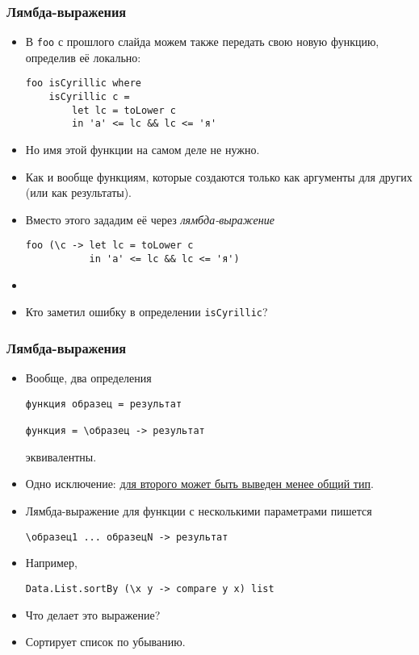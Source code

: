 \documentclass[10pt]{beamer}
\begin{document}
\begin{frame}[fragile]
\frametitle{Лямбда-выражения}
\begin{itemize}
    \item В \lstinline|foo| с прошлого слайда можем также передать свою новую функцию, определив её локально:
\begin{lstlisting}
foo isCyrillic where 
    isCyrillic c = 
        let lc = toLower c 
        in 'а' <= lc && lc <= 'я'
\end{lstlisting}\pause
    \item Но имя этой функции на самом деле не нужно.
    \item Как и вообще функциям, которые создаются только как аргументы для других (или как результаты).\pause
    \item Вместо этого зададим её через \emph{лямбда-выражение}
\begin{lstlisting}
foo (\c -> let lc = toLower c 
           in 'а' <= lc && lc <= 'я')
\end{lstlisting}\pause
    \pause
    \item[]
    \item Кто заметил ошибку в определении \lstinline|isCyrillic|?
\end{itemize}
\end{frame}

\begin{frame}[fragile]
\frametitle{Лямбда-выражения}
\begin{itemize}
    \item Вообще, два определения
\begin{lstlisting}
функция образец = результат

функция = \образец -> результат
\end{lstlisting}
    эквивалентны.\pause
    \item Одно исключение: \href{https://wiki.haskell.org/Monomorphism_restriction}{для второго может быть выведен менее общий тип}.\pause
    \item Лямбда-выражение для функции с несколькими параметрами пишется
\begin{lstlisting}
\образец1 ... образецN -> результат
\end{lstlisting}\pause
    \item Например, 
\begin{lstlisting}
Data.List.sortBy (\x y -> compare y x) list
\end{lstlisting}
    \item Что делает это выражение?\pause
    \item Сортирует список по убыванию.
\end{itemize}
\end{frame}
\end{document}
